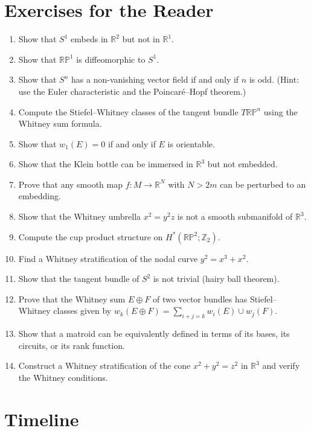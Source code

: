 \section*{Exercises for the Reader}

\begin{enumerate}
    \item [B] Show that $S^1$ embeds in $\mathbb{R}^2$ but not in $\mathbb{R}^1$.
    \item [B] Show that $\mathbb{RP}^1$ is diffeomorphic to $S^1$.
    \item [I] Show that $S^n$ has a non-vanishing vector field if and only if $n$ is odd. (Hint: use the Euler characteristic and the Poincar{\'e}--Hopf theorem.)
    \item [I] Compute the Stiefel--Whitney classes of the tangent bundle $T\mathbb{RP}^n$ using the Whitney sum formula.
    \item [I] Show that $w_1(E) = 0$ if and only if $E$ is orientable.
    \item [I] Show that the Klein bottle can be immersed in $\mathbb{R}^3$ but not embedded.
    \item [A] Prove that any smooth map $f: M \to \mathbb{R}^N$ with $N > 2m$ can be perturbed to an embedding.
    \item [B] Show that the Whitney umbrella $x^2 = y^2 z$ is not a smooth submanifold of $\mathbb{R}^3$.
    \item [I] Compute the cup product structure on $H^*(\mathbb{RP}^2; \mathbb{Z}_2)$.
    \item [I] Find a Whitney stratification of the nodal curve $y^2 = x^3 + x^2$.
    \item [B] Show that the tangent bundle of $S^2$ is not trivial (hairy ball theorem).
    \item [I] Prove that the Whitney sum $E \oplus F$ of two vector bundles has Stiefel--Whitney classes given by $w_k(E \oplus F) = \sum_{i+j=k} w_i(E) \cup w_j(F)$.
    \item [B] Show that a matroid can be equivalently defined in terms of its bases, its circuits, or its rank function.
    \item [A] Construct a Whitney stratification of the cone $x^2 + y^2 = z^2$ in $\mathbb{R}^3$ and verify the Whitney conditions.
\end{enumerate}

\section*{Timeline}

